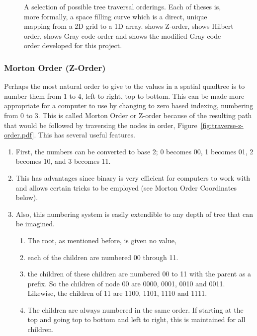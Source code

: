 \begin{figure}[tbhp]
	\caption[A selection of possible tree traversal orderings]{A selection of
		possible tree traversal orderings. Each of theses is, more formally, a
		space filling curve which is a direct, unique mapping from a 2D grid to
		a 1D array.  shows Z-order,
		 shows Hilbert order,
		 shows Gray code order and
		 shows the modified Gray code
		order developed for this project.}\label{fig:order_traversals}
\end{figure}

\subsubsection[Morton Order]{Morton Order (Z-Order)}
\label{ssub:morton_code_z_order_}

Perhaps the most natural order to give to the values in a spatial quadtree is
to number them from 1 to 4, left to right, top to bottom. This can be made more
appropriate for a computer to use by changing to zero based indexing,
numbering from 0 to 3. This is called Morton Order\cite{mortoncomputer} or
Z-order because of the resulting path that would be followed by traversing the
nodes in order, Figure~\ref{fig:traverse-z-order.pdf}. This has several useful
features.

\begin{enumerate}
	\item First, the numbers can be converted to base 2; 0 becomes 00, 1
		becomes 01, 2 becomes 10, and 3 becomes 11.

	\item This has advantages since binary is very efficient for computers to
	work with and allows certain tricks to be employed (see Morton Order
	Coordinates below).

	\item Also, this numbering system is easily extendible to any depth of
	tree that can be imagined.

	\begin{enumerate}
		\item The root, as mentioned before, is given no value,
		\item each of the children are numbered {00} through 11.

		\item the children of these children are numbered 00 to 11 with the
		parent as a prefix. So the children of node 00 are 0000, 0001, 0010
		and 0011. Likewise, the children of 11 are 1100, 1101, 1110 and 1111.

		\item The children are always numbered in the same order. If starting
		at the top and going top to bottom and left to right, this is
		maintained for all children.
	\end{enumerate}
\end{enumerate}


